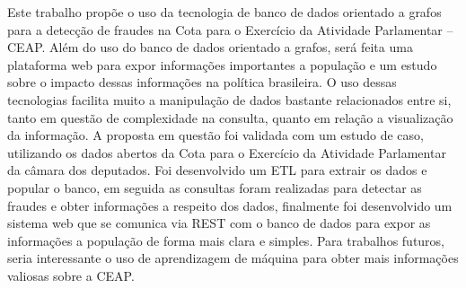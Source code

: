 	Este trabalho propõe o uso da tecnologia de banco de dados orientado a grafos para a detecção de fraudes na Cota para o Exercício da Atividade Parlamentar – CEAP. Além do uso do banco de dados orientado a grafos, será feita uma plataforma web para expor informações importantes a população e um estudo sobre o impacto dessas informações na política brasileira. O uso dessas tecnologias facilita muito a manipulação de dados bastante relacionados entre si, tanto em questão de complexidade na consulta, quanto em relação a visualização da informação. A proposta em questão foi validada com um estudo de caso, utilizando os dados abertos da Cota para o Exercício da Atividade Parlamentar da câmara dos deputados. Foi desenvolvido um ETL para extrair os dados e popular o banco, em seguida as consultas foram realizadas para detectar as fraudes e obter informações a respeito dos dados, finalmente foi desenvolvido um sistema web que se comunica via REST com o banco de dados para expor as informações a população de forma mais clara e simples. Para trabalhos futuros, seria interessante o uso de aprendizagem de máquina para obter mais informações valiosas sobre a CEAP.